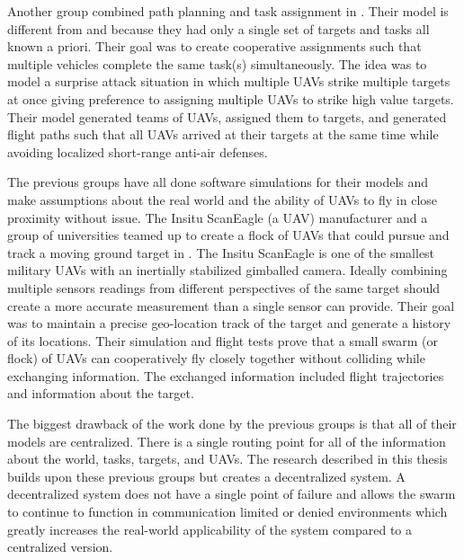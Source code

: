 Another group combined path planning and task assignment in \cite{beard}.  Their model is different from \cite{jin} and \cite{wheeler} because they had only a single set of targets and tasks all known a priori.  Their goal was to create cooperative assignments such that multiple vehicles complete the same task(s) simultaneously.  The idea was to model a surprise attack situation in which multiple UAVs strike multiple targets at once giving preference to assigning multiple UAVs to strike high value targets.  Their model generated teams of UAVs, assigned them to targets, and generated flight paths such that all UAVs arrived at their targets at the same time while avoiding localized short-range anti-air defenses.

The previous groups have all done software simulations for their models and make assumptions about the real world and the ability of UAVs to fly in close proximity without issue.  The Insitu ScanEagle (a UAV) manufacturer and a group of universities teamed up to create a flock of UAVs that could pursue and track a moving ground target in \cite{wheeler}.  The Insitu ScanEagle is one of the smallest military UAVs with an inertially stabilized gimballed camera.  Ideally combining multiple sensors readings from different perspectives of the same target should create a more accurate measurement than a single sensor can provide.  Their goal was to maintain a precise geo-location track of the target and generate a history of its locations.  Their simulation and flight tests prove that a small swarm (or flock) of UAVs can cooperatively fly closely together without colliding while exchanging information.  The exchanged information included flight trajectories and information about the target. 

The biggest drawback of the work done by the previous groups is that all of their models are centralized.  There is a single routing point for all of the information about the world, tasks, targets, and UAVs.  The research described in this thesis  builds upon these previous groups but creates a decentralized system.  A decentralized system does not have a single point of failure and allows the swarm to continue to function in communication limited or denied environments which greatly increases the real-world applicability of the system compared to a centralized version.
